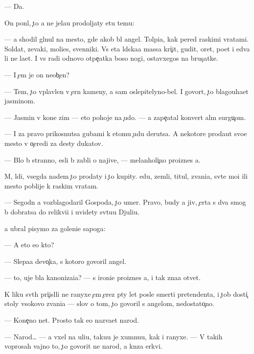 \documentclass[10pt]{book}
\begin{document}
— Da.

On pon{\ia}l, {\c}to {\y}a ne jela{\y}u prodoljaty etu temu:

— {\Y}a shodil gl{\ia}nul na mesto, gde {\y}akob{\yi} b{\yi}l angel. Tolpi{\x}a, kak pered ra{\y}skimi vratami. Soldat{\yi}, zevaki, mol{\ia}{\x}i{\y}es{\ia}, sv{\ia}{\x}enniki. Vs{\ia} eta l{\iu}dska{\y}a massa kri{\c}it, gudit, oret, po{\y}et i {\y}edva li ne la{\y}et. I vs{\e} radi odnovo otpe{\c}atka boso{\y} nogi, ostavxegos{\ia} na brus{\c}atke.

— I {\c}em je on neob{\yi}{\c}en?

— Tem, {\c}to vplavlen v {\c}ern{\yi}{\y} kameny, a sam oslepitelyno-bel. I govor{\ia}t, {\c}to blagouha{\y}et jasminom.

— Jasmin v kon{\q}e zim{\yi} — eto pohoje na {\c}udo. — {\Y}a zape{\c}atal konvert al{\yi}m surgu{\c}om.

— I za pravo prikosnutsa gubami k etomu {\c}udu derutsa. A nekotor{\yi}{\y}e proda{\y}ut svo{\y}e mesto v o{\c}eredi za des{\ia}ty dukatov.

— B{\yi}lo b{\yi} stranno, {\y}esli b{\yi} zab{\yi}li o najive, — melanholi{\c}no pro{\y}iznes {\y}a.

M{\yi}, l{\iu}di, vsegda na{\y}dem {\c}to prodaty i {\c}to kupity. {\Y}edu, zemli, titul{\yi}, zvani{\y}a, sv{\ia}t{\yi}{\y}e mo{\x}i ili mesto poblije k ra{\y}skim vratam.

— Segodn{\ia} {\y}a vozblagodaril Gospoda, {\c}to umer. Pravo, budy {\y}a jiv, {\c}erta s dva smog b{\yi} dobratsa do relikvi{\y}i i uvidety sv{\ia}tu{\y}u Djuli{\y}u.

{\Y}a ubral pisymo za goleni{\x}e sapoga:

— A eto {\y}e{\x}o kto?

— Slepa{\y}a devo{\c}ka, s kotoro{\y} govoril angel.

— {\C}to, uje b{\yi}la kanoniza{\q}i{\y}a? — s ironi{\y}e{\y} pro{\y}iznes {\y}a, i tak zna{\y}a otvet.

K liku sv{\ia}t{\yi}h pri{\c}isl{\ia}li ne ranyxe {\c}em {\c}erez p{\ia}ty let posle smerti pretendenta, i {\c}tob{\yi} dosti{\c} stoly v{\yi}sokovo zvani{\y}a — slov o tom, {\c}to govoril s angelom, nedostato{\c}no.

— Kone{\c}no net. Prosto tak {\y}e{\y}o naz{\yi}va{\y}et narod.

— Narod… — {\Y}a v{\yi}xel na uli{\q}u, taku{\y}u je xumnu{\y}u, kak i ranyxe. — V takih voprosah vajno to, {\c}to govorit ne narod, a kn{\ia}z{\y}a {\q}erkvi.
\end{document}
